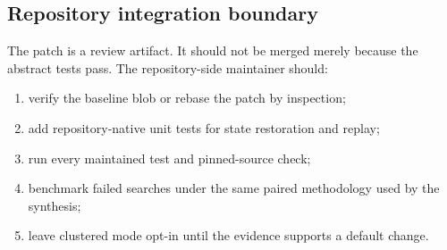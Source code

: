 \subsection{Repository integration boundary}

The patch is a review artifact.  It should not be merged merely because the
abstract tests pass.  The repository-side maintainer should:
\begin{enumerate}
\item verify the baseline blob or rebase the patch by inspection;
\item add repository-native unit tests for state restoration and replay;
\item run every maintained test and pinned-source check;
\item benchmark failed searches under the same paired methodology used by the
      synthesis;
\item leave clustered mode opt-in until the evidence supports a default change.
\end{enumerate}
